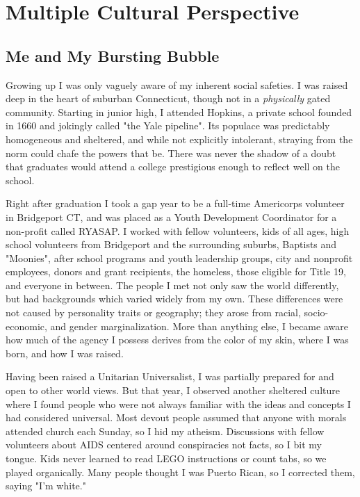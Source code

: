 \chapter{Multiple Cultural Perspective}


\section*{Me and My Bursting Bubble}

Growing up I was only vaguely aware of my inherent social safeties. I
was raised deep in the heart of suburban Connecticut, though not in a
\emph{physically} gated community. Starting in junior high, I attended
Hopkins, a private school founded in 1660 and jokingly called "the Yale
pipeline". Its populace was predictably homogeneous and sheltered, and
while not explicitly intolerant, straying from the norm could chafe the
powers that be. There was never the shadow of a doubt that graduates
would attend a college prestigious enough to reflect well on the school.

Right after graduation I took a gap year to be a full-time Americorps
volunteer in Bridgeport CT, and was placed as a Youth Development
Coordinator for a non-profit called RYASAP. I worked with fellow
volunteers, kids of all ages, high school volunteers from Bridgeport
and the surrounding suburbs, Baptists and "Moonies", after school
programs and youth leadership groups, city and nonprofit employees,
donors and grant recipients, the homeless, those eligible for Title
19, and everyone in between. The people I met not only saw the world
differently, but had backgrounds which varied widely from my own. These
differences were not caused by personality traits or geography; they
arose from racial, socio-economic, and gender marginalization. More than
anything else, I became aware how much of the agency I possess derives
from the color of my skin, where I was born, and how I was raised.

Having been raised a Unitarian Universalist, I was partially prepared
for and open to other world views. But that year, I observed another
sheltered culture where I found people who were not always familiar
with the ideas and concepts I had considered universal. Most devout
people assumed that anyone with morals attended church each Sunday, so I
hid my atheism. Discussions with fellow volunteers about AIDS centered
around conspiracies not facts, so I bit my tongue. Kids never learned
to read LEGO instructions or count tabs, so we played organically. Many
people thought I was Puerto Rican, so I corrected them, saying "I'm
white."

